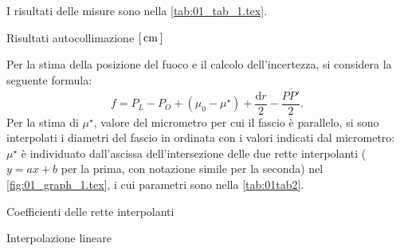 

I risultati delle misure sono nella \autoref{tab:01_tab_1.tex}.
\begin{tabella}
	\centering
	
	\caption{Risultati autocollimazione $[\,\mathrm{cm}\,]$}
	\label{tab:01_tab_1.tex}
\end{tabella}
Per la stima della posizione del fuoco e il calcolo dell'incertezza, si considera la seguente formula:
\begin{equation} \label{eq:autocollimazione}
f = P_L - P_O + \left(\mu _0 - \mu ^{\star}\right) + \frac{\mathrm{d}r}{2} - \frac{\overline{PP'}}{2}.
\end{equation}
Per la stima di $ \mu ^{\star} $, valore del micrometro per cui il fascio \`e parallelo, si sono interpolati i diametri del fascio in ordinata con i valori indicati dal micrometro: $ \mu ^{\star}$ \`e individuato dall'ascissa dell'intersezione delle due rette interpolanti ($y=ax+b$ per la prima, con notazione simile per la seconda) nel \autoref{fig:01_graph_1.tex}, i cui parametri sono nella \autoref{tab:01tab2}.
\begin{tabella}
	\centering
	
	\caption{Coefficienti delle rette interpolanti}
	\label{tab:01tab2}
\end{tabella}

\begin{grafico} \centering  \caption{Interpolazione lineare} \label{fig:01_graph_1.tex} \end{grafico}


